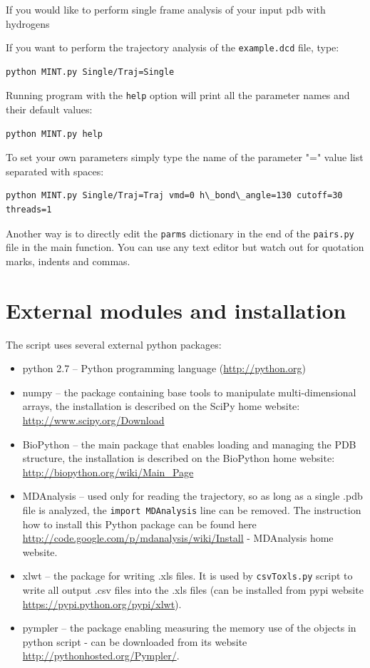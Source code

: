 \documentclass[12pt]{article}
\begin{document}
If you would like to perform single frame analysis of your input pdb with hydrogens  

If you want to perform the trajectory analysis of the \texttt{example.dcd} file, type: 
\begin{verbatim}
python MINT.py Single/Traj=Single
\end{verbatim}

Running program with the \texttt{help} option will print all the parameter names and their default values:
\begin{verbatim}
python MINT.py help
\end{verbatim}

To set your own parameters simply type the name of the parameter "=" value list separated with spaces:
\begin{verbatim}
python MINT.py Single/Traj=Traj vmd=0 h\_bond\_angle=130 cutoff=30 threads=1
\end{verbatim}

Another way is to directly edit the  \texttt{parms} dictionary in the end of the \texttt{pairs.py} file in the main function. You can use any text editor but watch out for quotation marks, indents and commas. 


\section{External modules and installation} \label{external}
The script uses several external python packages:
\begin{itemize}
\item python 2.7 -- Python programming language (\url{http://python.org})
\item numpy --  the package containing base tools to manipulate multi-dimensional arrays, the installation is described on the SciPy home website: \url{http://www.scipy.org/Download}
\item BioPython -- the main package that enables loading and managing the PDB structure, the installation is described on the BioPython home website: \url{http://biopython.org/wiki/Main_Page}
\item MDAnalysis \cite{Denning2012} -- used only for reading the trajectory, so as long as a single .pdb file is  analyzed, the \texttt{import MDAnalysis} line can be removed. The instruction how to install this Python package can be found here \url{http://code.google.com/p/mdanalysis/wiki/Install} - MDAnalysis home website. 
\item xlwt -- the package for writing .xls files. It is used by \texttt{csvToxls.py} script to write all output .csv files into the .xls files (can be installed from pypi website \url{https://pypi.python.org/pypi/xlwt}).
\item pympler -- the package enabling measuring the memory use of the objects in python script - can be downloaded from its website \url{http://pythonhosted.org/Pympler/}. 
\end{itemize}
\end{document}
